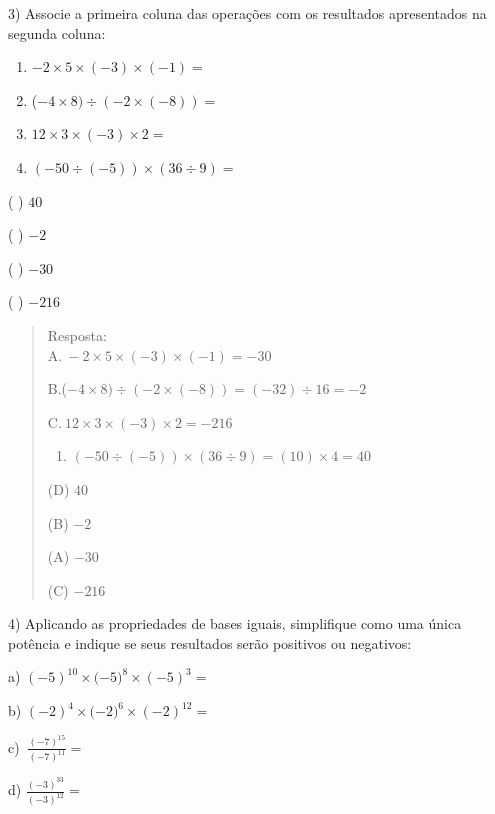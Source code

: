 {{3) Associe a primeira coluna das operações com os resultados
apresentados na segunda coluna:

\begin{enumerate}
\def\labelenumi{\Alph{enumi}.}
\item
  \(- 2 \times 5 \times \left( - 3 \right) \times \left( - 1 \right) =\)
\item
  (\(- 4 \times 8) \div ( - 2 \times \left( - 8 \right)) =\)
\item
  \(12 \times 3 \times \left( - 3 \right) \times 2 =\)
\item
  \(( - 50 \div \left( - 5 \right)) \times (36 \div 9) =\)
\end{enumerate}

( ) \(40\)

( ) \(- 2\)

( ) \(- 30\)

( ) \(- 216\)

\begin{quote}
Resposta:\\
A.\(\  - 2 \times 5 \times \left( - 3 \right) \times \left( - 1 \right) = - 30\)

B.(\(- 4 \times 8) \div ( - 2 \times \left( - 8 \right)) = \left( - 32 \right) \div 16 = - 2\)

C.\(\ 12 \times 3 \times \left( - 3 \right) \times 2 = - 216\)

\begin{enumerate}
\def\labelenumi{\Alph{enumi}.}
\setcounter{enumi}{3}
\tightlist
\item
  \(\left( - 50 \div \left( - 5 \right) \right) \times \left( 36 \div 9 \right) = \left( 10 \right) \times 4 = 40\)
\end{enumerate}

(D) \(40\)

(B) \(- 2\)

(A) \(- 30\)

(C) \(- 216\)
\end{quote}

4) Aplicando as propriedades de bases iguais, simplifique como uma única
potência e indique se seus resultados serão positivos ou negativos:

a) \({( - 5)}^{10} \times ( - {5)}^{8} \times {( - 5)}^{3} =\)

b) \({( - 2)}^{4} \times ( - {2)}^{6} \times {( - 2)}^{12} =\)

c) \(\ \frac{{( - 7)}^{15}}{{( - 7)}^{11}} =\)

d) \(\frac{{( - 3)}^{33}}{{( - 3)}^{12}} =\)

}}
